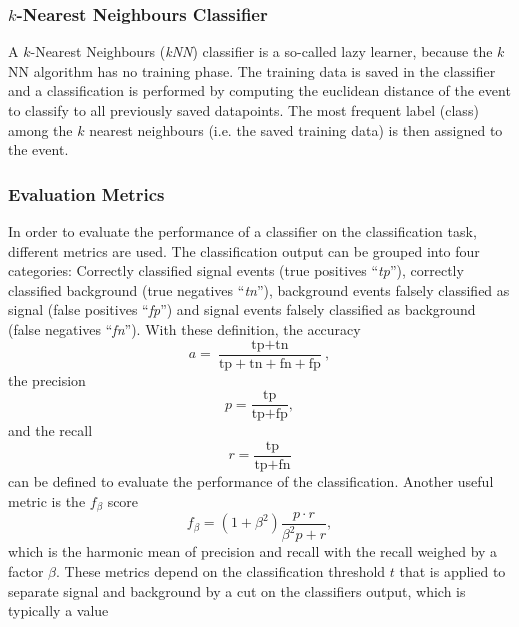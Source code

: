 \subsubsection{$k$-Nearest Neighbours Classifier}
\label{subsec:kNN}
A $k$-Nearest Neighbours (\textit{kNN}) classifier is a so-called lazy learner, because the $k$NN algorithm has no training phase.
The training data is saved in the classifier and a classification is performed by computing the euclidean distance of the event to classify to 
all previously saved datapoints. The most frequent label (class) among the $k$ nearest neighbours (i.e. the saved training data) is then 
assigned to the event.

\subsubsection{Evaluation Metrics}
\label{subsec:Evaluation}
In order to evaluate the performance of a classifier on the classification task, different metrics are used.
The classification output can be grouped into four categories: Correctly classified signal events (true positives \enquote{\textit{tp}}), correctly classified background 
(true negatives \enquote{\textit{tn}}), background events falsely classified as signal (false positives \enquote{\textit{fp}}) and signal events falsely classified as background
(false negatives \enquote{\textit{fn}}). With these definition, the accuracy 
\begin{equation}
    a = \frac{\text{tp} + \text{tn}}{\text{tp} + \text{tn} + \text{fn} + \text{fp}},
    \label{eq:accuracy}
\end{equation}
the precision
\begin{equation}
    p = \frac{\text{tp} }{\text{tp} + \text{fp}},
    \label{eq:precision}
\end{equation}
and the recall 
\begin{equation}
    r = \frac{\text{tp} }{\text{tp} + \text{fn}}
    \label{eq:recall}
\end{equation}
can be defined to evaluate the performance of the classification.
Another useful metric is the $f_\beta$ score
\begin{equation}
    f_\beta = (1 + \beta^2)\frac{p \cdot r}{\beta^2 p + r},
    \label{eq:f_beta}
\end{equation}
which is the harmonic mean of precision and recall with the recall weighed by a factor $\beta$.
These metrics depend on the classification threshold $t$ that is applied to separate signal and background by a cut on the classifiers output, which is typically a value 
